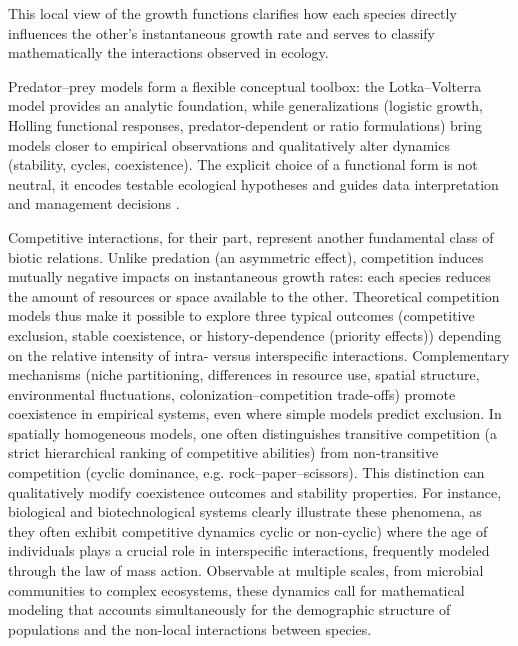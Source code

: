 \documentclass[10pt, a4paper]{amsart}
\theoremstyle{plain}
\theoremstyle{definition}
\theoremstyle{remark}
\numberwithin{equation}{section}
\begin{document}
This local view of the growth functions clarifies how each species directly influences the other’s instantaneous growth rate and serves to classify mathematically the interactions observed in ecology.

Predator–prey models form a flexible conceptual toolbox: the Lotka–Volterra model provides an analytic foundation, while generalizations (logistic growth, Holling functional responses, predator-dependent or ratio formulations) bring models closer to empirical observations and qualitatively alter dynamics (stability, cycles, coexistence). The explicit choice of a functional form is not neutral, it encodes testable ecological hypotheses and guides data interpretation and management decisions \cite{ref5,ref55,ref56,ref39,ref29,ref3,ref30,ref8,ref9,ref35}.

Competitive interactions, for their part, represent another fundamental class of biotic relations. Unlike predation (an asymmetric effect), competition induces mutually negative impacts on instantaneous growth rates: each species reduces the amount of resources or space available to the other. Theoretical competition models thus make it possible to explore three typical outcomes (competitive exclusion, stable coexistence, or history-dependence (priority effects)) depending on the relative intensity of intra- versus interspecific interactions. Complementary mechanisms (niche partitioning, differences in resource use, spatial structure, environmental fluctuations, colonization–competition trade-offs) promote coexistence in empirical systems, even where simple models predict exclusion. In spatially homogeneous models, one often distinguishes transitive competition (a strict hierarchical ranking of competitive abilities) from non-transitive competition (cyclic dominance, e.g. rock–paper–scissors). This distinction can qualitatively modify coexistence outcomes and stability properties. For instance, biological and biotechnological systems clearly illustrate these phenomena, as they often exhibit competitive dynamics cyclic or non-cyclic)  where the age of individuals plays a crucial role in interspecific interactions, frequently modeled through the law of mass action. Observable at multiple scales, from microbial communities to complex ecosystems, these dynamics call for mathematical modeling that accounts simultaneously for the demographic structure of populations and the non-local interactions between species.
\end{document}
